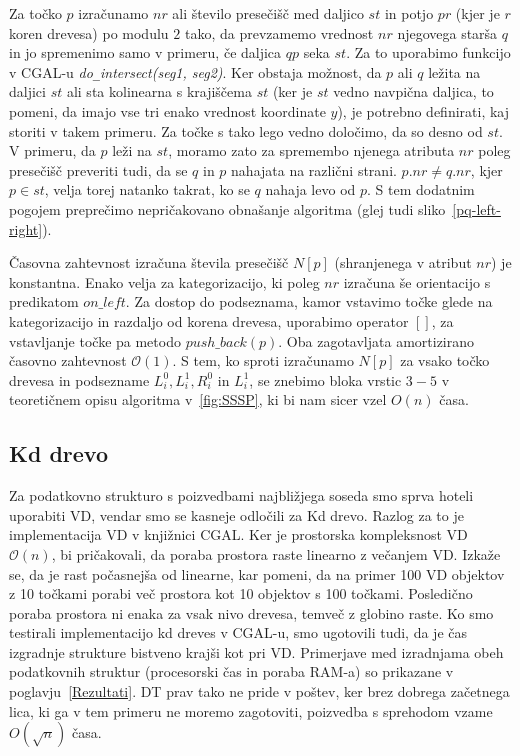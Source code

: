 \documentclass[a4paper, 12pt]{book}
\newcommand{\OO}{\ensuremath{\mathcal{O}}} %
\newcommand{\U}{\texttt{\_}}
\begin{document}
Za točko $p$ izračunamo $nr$ ali število presečišč med daljico $st$ in potjo $pr$ (kjer je $r$ koren drevesa) po modulu $2$ tako, da prevzamemo vrednost $nr$  njegovega starša $q$ in jo spremenimo samo v primeru, če daljica $qp$ seka $st$. Za to uporabimo funkcijo v CGAL-u \textit{do\U intersect(seg1, seg2)}. Ker obstaja možnost, da $p$ ali $q$ ležita na daljici $st$ ali sta kolinearna s krajiščema $st$ (ker je $st$ vedno navpična daljica, to pomeni, da imajo vse tri enako vrednost koordinate $y$), je potrebno definirati, kaj storiti v takem primeru. Za točke s tako lego vedno določimo, da so desno od $st$.  V primeru, da $p$ leži na $st$, moramo zato za spremembo njenega atributa $nr$ poleg presečišč preveriti tudi, da se $q$ in $p$ nahajata na različni strani. $p.nr\neq q.nr$, kjer $p\in st$, velja torej natanko takrat, ko se $q$ nahaja levo od $p$. S tem dodatnim pogojem preprečimo nepričakovano obnašanje algoritma (glej tudi sliko~\ref{pq-left-right}).

Časovna zahtevnost izračuna števila presečišč $N[p]$ (shranjenega v atribut $nr$) je konstantna. Enako velja za kategorizacijo, ki poleg $nr$ izračuna še orientacijo s predikatom $on\U left$. Za dostop do podseznama, kamor vstavimo točke glede na kategorizacijo in razdaljo od korena drevesa, uporabimo operator $[]$, za vstavljanje točke pa metodo $push\U back(p)$. Oba zagotavljata amortizirano časovno zahtevnost $\OO(1)$. S tem, ko sproti izračunamo $N[p]$ za vsako točko drevesa in podsezname $L_i^0, L_i^1, R_i^0$ in $L_i^1$, se znebimo bloka vrstic $3-5$ v teoretičnem opisu algoritma v~\ref{fig:SSSP}, ki bi nam sicer vzel $O(n)$ časa.

\subsection{Kd drevo}
Za podatkovno strukturo s poizvedbami najbližjega soseda smo sprva hoteli uporabiti VD, vendar smo se kasneje odločili za Kd drevo. Razlog za to je implementacija VD v knjižnici CGAL. Ker je prostorska kompleksnost VD $\OO(n)$, bi pričakovali, da poraba prostora raste linearno z večanjem VD. Izkaže se, da je rast počasnejša od linearne, kar pomeni, da na primer 100 VD objektov z 10 točkami porabi več prostora kot 10 objektov s 100 točkami. Posledično poraba prostora ni enaka za vsak nivo drevesa, temveč z globino raste. Ko smo testirali implementacijo kd dreves v CGAL-u, smo ugotovili tudi, da je čas izgradnje strukture bistveno krajši kot pri VD. Primerjave med izradnjama obeh podatkovnih struktur (procesorski čas in poraba RAM-a) so prikazane v poglavju~\ref{Rezultati}. DT prav tako ne pride v poštev, ker brez dobrega začetnega lica, ki ga v tem primeru ne moremo zagotoviti, poizvedba s sprehodom vzame $O(\sqrt{n})$ časa.
\end{document}
